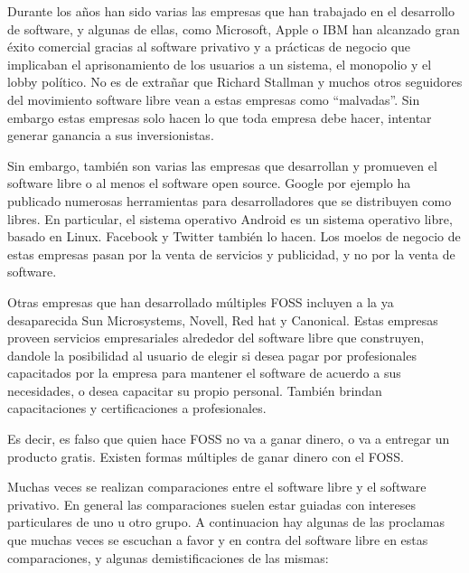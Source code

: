 Durante los años han sido varias las empresas que han trabajado en el desarrollo
de software, y algunas de ellas, como Microsoft, Apple o IBM han alcanzado gran
éxito comercial gracias al software privativo y a prácticas de negocio que
implicaban el aprisonamiento de los usuarios a un sistema, el monopolio y el
lobby político. No es de extrañar que Richard Stallman y muchos otros seguidores
del movimiento software libre vean a estas empresas como ``malvadas''. Sin
embargo estas empresas solo hacen lo que toda empresa debe hacer, intentar
generar ganancia a sus inversionistas.

Sin embargo, también son varias las empresas que desarrollan y promueven el
software libre o al menos el software open source. Google por ejemplo ha publicado
numerosas herramientas para desarrolladores que se distribuyen como libres. En
particular, el sistema operativo Android es un sistema operativo libre, basado
en Linux. Facebook y Twitter también lo hacen. Los moelos de negocio de estas
empresas pasan por la venta de servicios y publicidad, y no por la venta de software.

Otras empresas que han desarrollado múltiples FOSS incluyen a la ya desaparecida
Sun Microsystems, Novell, Red hat y Canonical. Estas empresas proveen servicios
empresariales alrededor del software libre que construyen, dandole la posibilidad
al usuario de elegir si desea pagar por profesionales capacitados por la empresa
para mantener el software de acuerdo a sus necesidades, o desea capacitar su
propio personal. También brindan capacitaciones y certificaciones a profesionales.

Es decir, es falso que quien hace FOSS no va a ganar dinero, o va a entregar un
producto gratis. Existen formas múltiples de ganar dinero con el FOSS.

Muchas veces se realizan comparaciones entre el software libre y el software
privativo. En general las comparaciones suelen estar guiadas con intereses
particulares de uno u otro grupo. A continuacion hay algunas de las proclamas
que muchas veces se escuchan a favor y en contra del software libre en estas
comparaciones, y algunas demistificaciones de las mismas:

